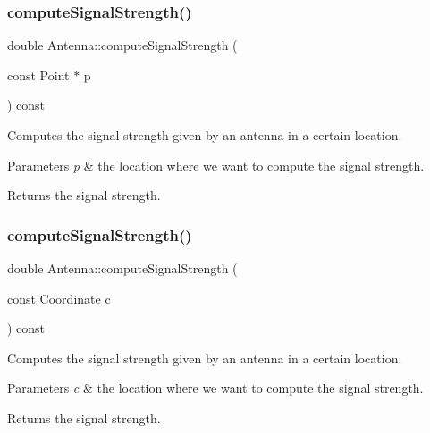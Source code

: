 \mbox{\label{class_antenna_a228297a3cb00c11fab97d615b4817656}} 
\subsubsection{\texorpdfstring{computeSignalStrength()}{computeSignalStrength()}\hspace{0.1cm}{\footnotesize\ttfamily [1/2]}}
{\footnotesize\ttfamily double Antenna\+::compute\+Signal\+Strength (\begin{DoxyParamCaption}\item[{const Point $\ast$}]{p }\end{DoxyParamCaption}) const}

Computes the signal strength given by an antenna in a certain location. 
\begin{DoxyParams}{Parameters}
{\em p} & the location where we want to compute the signal strength. \\
\hline
\end{DoxyParams}
\begin{DoxyReturn}{Returns}
the signal strength. 
\end{DoxyReturn}
\mbox{\label{class_antenna_ac33fe5654d4e3307a4c1c155b0f89128}} 
\subsubsection{\texorpdfstring{computeSignalStrength()}{computeSignalStrength()}\hspace{0.1cm}{\footnotesize\ttfamily [2/2]}}
{\footnotesize\ttfamily double Antenna\+::compute\+Signal\+Strength (\begin{DoxyParamCaption}\item[{const Coordinate}]{c }\end{DoxyParamCaption}) const}

Computes the signal strength given by an antenna in a certain location. 
\begin{DoxyParams}{Parameters}
{\em c} & the location where we want to compute the signal strength. \\
\hline
\end{DoxyParams}
\begin{DoxyReturn}{Returns}
the signal strength. 
\end{DoxyReturn}
\mbox{\label{class_antenna_a38bb70c5ca249773512186c34792b43a}} 
